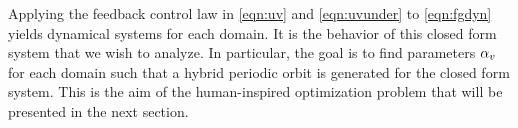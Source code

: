 Applying the feedback control law in \eqref{eqn:uv} and \eqref{eqn:uvunder} to \eqref{eqn:fgdyn} yields dynamical systems for each domain.   It is the behavior of this closed form system that we wish to analyze.  In particular, the goal is to find parameters $\alpha_{v}$ for each domain such that a hybrid periodic orbit is generated for the closed form system.  This is the aim of the human-inspired optimization problem that will be presented in the next section.

%
%
